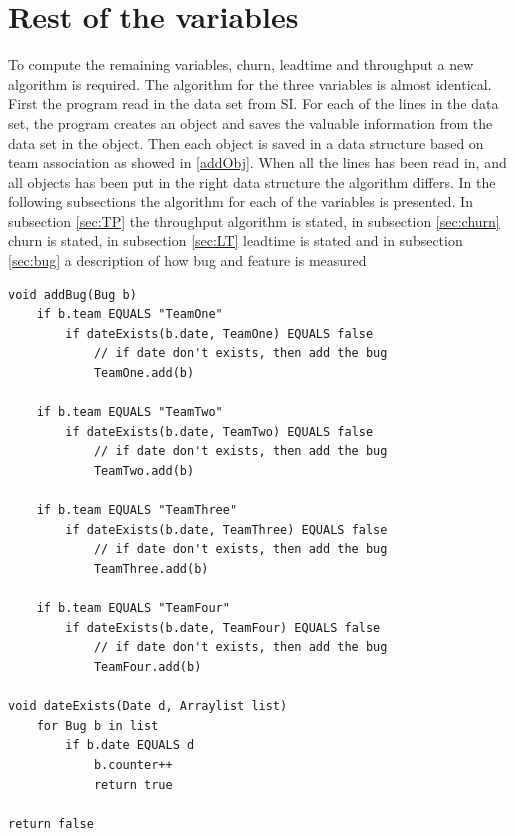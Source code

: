 \documentclass[UKenglish]{ifimaster}  %
\begin{document}
 \section{Rest of the variables}
 \label{sec:rotv}
To compute the remaining variables, churn, leadtime and throughput a new algorithm is required.  The algorithm for the three variables is almost identical. First the program read in the data set from SI. For each of the lines in the data set, the program creates an object and saves the valuable information from the data set in the object. Then each object is saved in a data structure based on team association as showed in \ref{addObj}. When all the lines has been read in, and all objects has been put in the right data structure the algorithm differs. In the following subsections the algorithm for each of the variables is presented. In subsection \ref{sec:TP} the throughput algorithm is stated, in subsection \ref{sec:churn} churn is stated, in subsection \ref{sec:LT} leadtime is stated and in subsection \ref{sec:bug}  a description of how bug and feature is measured 
\begin{minipage}{\textwidth}
\begin{lstlisting}[caption=Pseudocode example of how throughput objects are added, label=addObj]
void addBug(Bug b)
	if b.team EQUALS "TeamOne"
		if dateExists(b.date, TeamOne) EQUALS false
			// if date don't exists, then add the bug
			TeamOne.add(b)
			
	if b.team EQUALS "TeamTwo"
		if dateExists(b.date, TeamTwo) EQUALS false
			// if date don't exists, then add the bug
			TeamTwo.add(b)
			
	if b.team EQUALS "TeamThree"
		if dateExists(b.date, TeamThree) EQUALS false 
			// if date don't exists, then add the bug
			TeamThree.add(b)
			
	if b.team EQUALS "TeamFour"
		if dateExists(b.date, TeamFour) EQUALS false
			// if date don't exists, then add the bug
			TeamFour.add(b)
		
void dateExists(Date d, Arraylist list)
	for Bug b in list
		if b.date EQUALS d
			b.counter++
			return true
	
return false	
 \end{lstlisting}
 \end{minipage}
 
\end{document}
